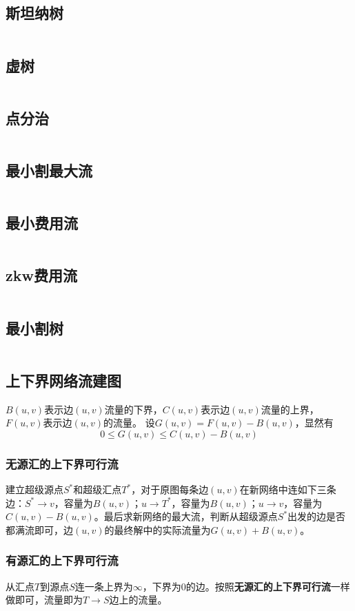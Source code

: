 \subsection{斯坦纳树}
\inputminted{cpp}{\source/graph-theory/Steiner-Tree.cpp}
\subsection{虚树}
\inputminted{cpp}{\source/graph-theory/mirage-tree.cpp}
\subsection{点分治}
\inputminted{cpp}{\source/graph-theory/vertex-partition.cpp}
\subsection{最小割最大流}
\inputminted{cpp}{\source/graph-theory/dinic.cpp}
\subsection{最小费用流}
\inputminted{cpp}{\source/graph-theory/mincost-maxflow.cpp}
\subsection{zkw费用流}
\inputminted{cpp}{\source/graph-theory/zkw-cost-flow.cpp}
\subsection{最小割树}
\inputminted{cpp}{\source/graph-theory/GH-tree.cpp}
\subsection{上下界网络流建图}
$B(u,v)$表示边$(u,v)$流量的下界，$C(u,v)$表示边$(u,v)$流量的上界，$F(u,v)$表示边$(u,v)$的流量。
设$G(u,v) = F(u,v) - B(u,v)$，显然有
$$0 \leq G(u,v) \leq C(u,v)-B(u,v)$$
\subsubsection{无源汇的上下界可行流}
建立超级源点$S^*$和超级汇点$T^*$，对于原图每条边$(u,v)$在新网络中连如下三条边：$S^* \rightarrow v$，容量为$B(u,v)$；$u \rightarrow T^*$，容量为$B(u,v)$；$u \rightarrow v$，容量为$C(u,v) - B(u,v)$。最后求新网络的最大流，判断从超级源点$S^*$出发的边是否都满流即可，边$(u,v)$的最终解中的实际流量为$G(u,v)+B(u,v)$。
\subsubsection{有源汇的上下界可行流}
从汇点$T$到源点$S$连一条上界为$\infty$，下界为$0$的边。按照\textbf{无源汇的上下界可行流}一样做即可，流量即为$T \rightarrow S$边上的流量。

